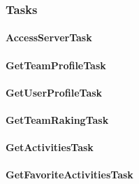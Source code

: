 \subsubsection{Tasks}
\paragraph{AccessServerTask}
\paragraph{GetTeamProfileTask}
\paragraph{GetUserProfileTask}
\paragraph{GetTeamRakingTask}
\paragraph{GetActivitiesTask}
\paragraph{GetFavoriteActivitiesTask}
\paragraph{}